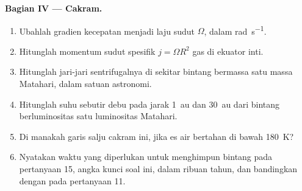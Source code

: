 \begin{problem}
\noindent\textbf{Bagian IV --- Cakram.}
\begin{enumerate}[resume]
  \item Ubahlah gradien kecepatan menjadi laju sudut $\Omega$, dalam
        \unit{rad.s^{-1}}.
  \item Hitunglah momentum sudut spesifik $j = \Omega R^2$ gas di
        ekuator inti.
  \item Hitunglah jari-jari sentrifugalnya di sekitar bintang bermassa satu massa Matahari, dalam
        satuan astronomi.
  \item Hitunglah suhu sebutir debu pada jarak \qty{1}{au} dan \qty{30}{au}
        dari bintang berluminositas satu luminositas Matahari.
  \item Di manakah garis salju cakram ini, jika es air bertahan di bawah
        \qty{180}{K}?
  \item Nyatakan waktu yang diperlukan untuk menghimpun bintang pada pertanyaan 15, angka
        kunci soal ini, dalam ribuan tahun, dan bandingkan dengan
         pada pertanyaan 11.
\end{enumerate}
\end{problem}
